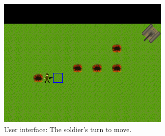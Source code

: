 \begin{figure}[ht]
\centering
\includegraphics[scale=0.6]{screenshots/16720.png}
\caption{User interface: The soldier's turn to move.}
\label{fig:gamescr1}
\end{figure}
